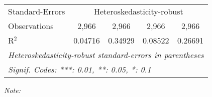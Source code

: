 \begin{table}[htbp!]
\begin{adjustbox}{width = 1\textwidth, max height = 0.95\textheight, center}
\begin{threeparttable}[b]
\begin{tabular}{lcccc}
            \midrule 
            Standard-Errors & \multicolumn{4}{c}{Heteroskedasticity-robust} \\ 
            Observations         & 2,966                          & 2,966                          & 2,966                           & 2,966\\  
            R$^2$                & 0.04716                        & 0.34929                        & 0.08522                         & 0.26691\\  
            \midrule \midrule
            \multicolumn{5}{l}{\emph{Heteroskedasticity-robust standard-errors in parentheses}}\\
            \multicolumn{5}{l}{\emph{Signif. Codes: ***: 0.01, **: 0.05, *: 0.1}}\\
         \end{tabular}
         
         \begin{tablenotes}\item \medskip \textit{Note:}
         \end{tablenotes}
      \end{threeparttable}
   \end{adjustbox}
\end{table}


